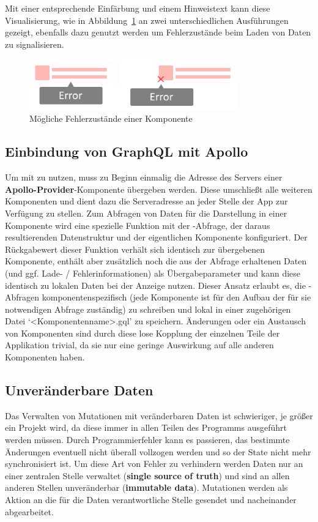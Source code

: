 Mit einer entsprechende Einfärbung und einem Hinweistext kann diese Visualisierung, wie in Abbildung~\ref{fig:comp_possible_error_state} an zwei unterschiedlichen Ausführungen gezeigt, ebenfalls dazu genutzt werden um Fehlerzustände beim Laden von Daten zu signalisieren.

\begin{figure}
    \centering
    \captionsetup{justification=centering}
    \includegraphics[width=0.8\textwidth]{figures/comp_possible_error_state.png}
        \caption{Mögliche Fehlerzustände einer Komponente}\label{fig:comp_possible_error_state}
\end{figure}

\subsection{Einbindung von GraphQL mit Apollo}
Um  mit  zu nutzen, muss zu Beginn einmalig die Adresse des Servers einer \textbf{Apollo-Provider}-Komponente übergeben werden. Diese umschließt alle weiteren Komponenten und dient dazu die Serveradresse an jeder Stelle der App zur Verfügung zu stellen. Zum Abfragen von Daten für die Darstellung in einer Komponente wird eine spezielle Funktion mit der -Abfrage, der daraus resultierenden Datenstruktur und der eigentlichen Komponente konfiguriert. Der Rückgabewert dieser Funktion verhält sich identisch zur übergebenen Komponente, enthält aber zusätzlich noch die aus der Abfrage erhaltenen Daten (und ggf. Lade- / Fehlerinformationen) als Übergabeparameter und kann diese identisch zu lokalen Daten bei der Anzeige nutzen.
Dieser Ansatz erlaubt es, die -Abfragen komponentenspezifisch (jede Komponente ist für den Aufbau der für sie notwendigen Abfrage zuständig) zu schreiben und lokal in einer zugehörigen Datei `<Komponentenname>.gql' zu speichern. Änderungen oder ein Austausch von Komponenten sind durch diese lose Kopplung der einzelnen Teile der Applikation trivial, da sie nur eine geringe Auswirkung auf alle anderen Komponenten haben.

\subsection{Unveränderbare Daten}
Das Verwalten von Mutationen mit veränderbaren Daten ist schwieriger, je größer ein Projekt wird, da diese immer in allen Teilen des Programms ausgeführt werden müssen. Durch Programmierfehler kann es passieren, das bestimmte Änderungen eventuell nicht überall vollzogen werden und so der State nicht mehr synchronisiert ist. Um diese Art von Fehler zu verhindern werden Daten nur an einer zentralen Stelle verwaltet (\textbf{single source of truth}) und sind an allen anderen Stellen unveränderbar (\textbf{immutable data}). Mutationen werden als Aktion an die für die Daten verantwortliche Stelle gesendet und nacheinander abgearbeitet.

